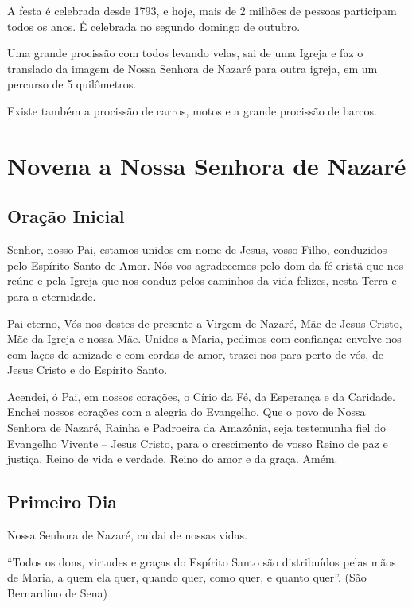 \documentclass[a4paper,14pt]{extarticle} \usepackage[utf8]{inputenc}
\begin{document}
A festa é celebrada desde 1793, e hoje, mais de 2 milhões de pessoas participam todos os anos.  É celebrada no segundo domingo de outubro.

Uma grande procissão com todos levando velas, sai de uma Igreja e faz o translado da imagem de Nossa Senhora de Nazaré para outra igreja, em um percurso de 5 quilômetros.

Existe também a procissão de carros, motos e a grande procissão de barcos.

\newpage

\newpage

\section{Novena a Nossa Senhora de Nazaré}
\subsection{Oração Inicial} \label{sec:oracao-inicial}

Senhor, nosso Pai, estamos unidos em nome de Jesus, vosso Filho, conduzidos pelo Espírito Santo de Amor. Nós vos agradecemos pelo dom da fé cristã que nos reúne e pela Igreja que nos conduz pelos caminhos da vida felizes, nesta Terra e para a eternidade.

Pai eterno, Vós nos destes de presente a Virgem de Nazaré, Mãe de Jesus Cristo, Mãe da Igreja e nossa Mãe. Unidos a Maria, pedimos com confiança: envolve-nos com laços de amizade e com cordas de amor, trazei-nos para perto de vós, de Jesus Cristo e do Espírito Santo.

Acendei, ó Pai, em nossos corações, o Círio da Fé, da Esperança e da Caridade. Enchei nossos corações com a alegria do Evangelho. Que o povo de Nossa Senhora de Nazaré, Rainha e Padroeira da Amazônia, seja testemunha fiel do Evangelho Vivente – Jesus Cristo, para o crescimento de vosso Reino de paz e justiça, Reino de vida e verdade, Reino do amor e da graça. Amém.

\subsection{Primeiro Dia}

\textbf{}

Nossa Senhora de Nazaré, cuidai de nossas vidas.

“Todos os dons, virtudes e graças do Espírito Santo são distribuídos pelas mãos de Maria, a quem ela quer, quando quer, como quer, e quanto quer”. (São Bernardino de Sena)
\end{document}
